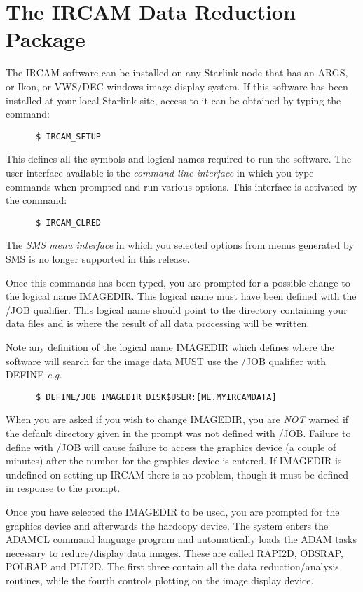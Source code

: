 \section {The IRCAM Data Reduction Package}

The IRCAM software can be installed on any Starlink node that has an ARGS,
or Ikon, or VWS/DEC-windows image-display system. If this software has been
installed at your local Starlink site, access to it can be obtained by
typing the command: 
\begin{verbatim}
      $ IRCAM_SETUP
\end{verbatim}
This defines all the symbols and logical names required to run the software.
The user interface available is
the {\em command line interface} in which you type commands when prompted
and run various options. This interface is activated by the command:
\begin{verbatim}
      $ IRCAM_CLRED
\end{verbatim}
The {\em SMS menu interface} in which you selected options from menus
generated by SMS is no longer supported in this release.

Once this commands has been typed, you are prompted for a possible
change to the logical name IMAGEDIR. This logical name must have been defined
with the /JOB qualifier. This logical name should point to the directory
containing your data files and  is where the result of all data processing will
be written.

Note any definition of the logical name IMAGEDIR which defines where the
software will search for the image data MUST use the /JOB qualifier with DEFINE
{\it e.g.}
\begin{verbatim}
      $ DEFINE/JOB IMAGEDIR DISK$USER:[ME.MYIRCAMDATA]
\end{verbatim}
When you are asked if you wish to change IMAGEDIR, you are {\em NOT\/}
warned if the default directory given in the prompt was not defined with
/JOB. Failure to define with /JOB will cause failure to access the
graphics device (a couple of minutes) after the number for the graphics
device is entered. If IMAGEDIR is undefined on setting up IRCAM there is
no problem, though it must be defined in response to the prompt. 

Once you have selected the IMAGEDIR to be used, you are prompted for the
graphics device and afterwards the hardcopy device. The system enters
the ADAMCL command language program and automatically loads the ADAM
tasks necessary to reduce/display data images. These are called RAPI2D,
OBSRAP, POLRAP and PLT2D. The first three contain all the data
reduction/analysis routines, while the fourth controls plotting on the
image display device. 


